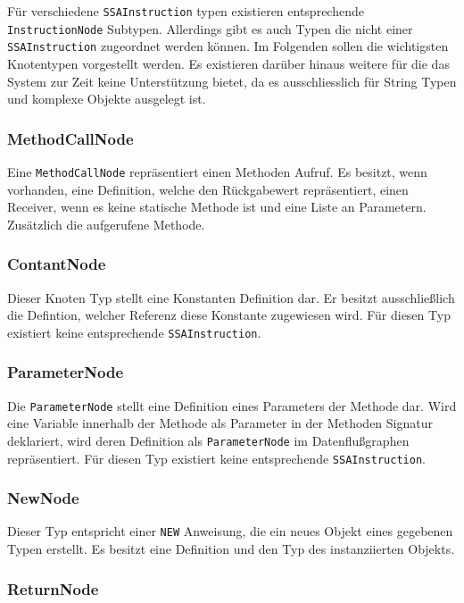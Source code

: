 Für verschiedene \texttt{SSAInstruction} typen existieren entsprechende 
\texttt{InstructionNode} Subtypen. Allerdings gibt es auch Typen die nicht
einer \texttt{SSAInstruction} zugeordnet werden können. Im Folgenden sollen die
wichtigsten Knotentypen vorgestellt werden. Es existieren darüber hinaus weitere
für die das System zur Zeit keine Unterstützung bietet, da es ausschliesslich für 
String Typen und komplexe Objekte ausgelegt ist.

\subsubsection{MethodCallNode}

Eine \texttt{MethodCallNode} repräsentiert einen Methoden Aufruf. Es besitzt, wenn
vorhanden, eine Definition, welche den Rückgabewert repräsentiert, einen Receiver, 
wenn es keine statische Methode ist und eine Liste an Parametern. Zusätzlich die 
aufgerufene Methode. 

\subsubsection{ContantNode}

Dieser Knoten Typ stellt eine Konstanten Definition dar. Er besitzt ausschließlich 
die Defintion, welcher Referenz diese Konstante zugewiesen wird. Für diesen Typ
existiert keine entsprechende \texttt{SSAInstruction}.

\subsubsection{ParameterNode}

Die \texttt{ParameterNode} stellt eine Definition eines Parameters der Methode dar.
Wird eine Variable innerhalb der Methode als Parameter in der Methoden Signatur
deklariert, wird deren Definition als \texttt{ParameterNode} im Datenflußgraphen
repräsentiert. Für diesen Typ existiert keine entsprechende \texttt{SSAInstruction}.

\subsubsection{NewNode}

Dieser Typ entspricht einer \texttt{NEW} Anweisung, die ein neues Objekt eines 
gegebenen Typen erstellt. Es besitzt eine Definition und den Typ des instanziierten
Objekts. 

\subsubsection{ReturnNode}

